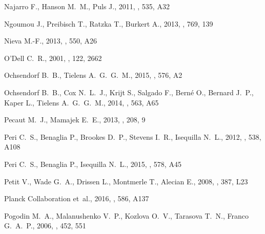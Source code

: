 \documentclass[useAMS, usenatbib, a4paper]{mnras}
\begin{document}
\begin{thebibliography}{}
{Najarro} F.,  {Hanson} M.~M.,   {Puls} J.,  2011, \aap, 535, A32

{Ngoumou} J.,  {Preibisch} T.,  {Ratzka} T.,   {Burkert} A.,  2013, \apj, 769,
  139

{Nieva} M.-F.,  2013, \aap, 550, A26

{O'Dell} C.~R.,  2001, \aj, 122, 2662

{Ochsendorf} B.~B.,  {Tielens} A.~G.~G.~M.,  2015, \aap, 576, A2

{Ochsendorf} B.~B.,  {Cox} N.~L.~J.,  {Krijt} S.,  {Salgado} F.,  {Bern{\'e}}
  O.,  {Bernard} J.~P.,  {Kaper} L.,   {Tielens} A.~G.~G.~M.,  2014, \aap, 563,
  A65

{Pecaut} M.~J.,  {Mamajek} E.~E.,  2013, \apjs, 208, 9

{Peri} C.~S.,  {Benaglia} P.,  {Brookes} D.~P.,  {Stevens} I.~R.,   {Isequilla}
  N.~L.,  2012, \aap, 538, A108

{Peri} C.~S.,  {Benaglia} P.,   {Isequilla} N.~L.,  2015, \aap, 578, A45

{Petit} V.,  {Wade} G.~A.,  {Drissen} L.,  {Montmerle} T.,   {Alecian} E.,
  2008, \mnras, 387, L23

{Planck Collaboration} et~al., 2016, \aap, 586, A137

{Pogodin} M.~A.,  {Malanushenko} V.~P.,  {Kozlova} O.~V.,  {Tarasova} T.~N.,
  {Franco} G.~A.~P.,  2006, \aap, 452, 551


\end{thebibliography}
\end{document}

